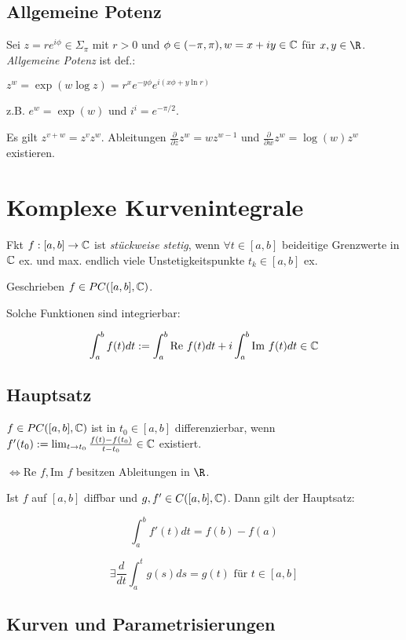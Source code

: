 \subsection*{Allgemeine Potenz}

Sei $z = re^{i\phi} \in \Sigma_\pi$ mit $r > 0$ und $\phi \in (-\pi,\pi), w = x + iy \in \mathbb{C}$ für $x, y \in \R$. \emph{Allgemeine Potenz} ist def.:

$z^w = \exp(w \log z) = r^x e^{-y\phi} e^{i(x\phi + y \ln r)}$

z.B. $e^w = \exp(w)$ und $i^i = e^{-\pi/2}$.

\spacing

Es gilt $z^{v+w} = z^v z^w$. Ableitungen $\frac{\partial}{\partial z} z^w = wz^{w-1}$ und $\frac{\partial}{\partial w} z^w = \log(w)z^w$ existieren.

\section*{Komplexe Kurvenintegrale}

Fkt $f : [a,b] \to \mathbb{C}$ ist \emph{stückweise stetig}, wenn $\forall t \in [a,b]$ beideitige Grenzwerte in $\mathbb{C}$ ex. und max. endlich viele Unstetigkeitspunkte $t_k \in [a,b]$ ex.

Geschrieben $f \in PC([a,b],\mathbb{C})$.

Solche Funktionen sind integrierbar:

\vspace*{-4mm}
$$\int_a^b f(t) dt := \int_a^b \text{Re } f(t) dt + i \int_a^b \text{Im } f(t) dt \in \mathbb{C}$$

\subsection*{Hauptsatz}

$f \in PC([a,b],\mathbb{C})$ ist in $t_0 \in [a,b]$ differenzierbar, wenn $f'(t_0) := \lim_{t \to t_0} \frac{f(t)-f(t_0)}{t-t_0} \in \mathbb{C}$ existiert.

$\iff \text{Re } f, \text{Im } f$ besitzen Ableitungen in $\R$.

Ist $f$ auf $[a,b]$ diffbar und $g, f' \in C([a,b],\mathbb{C})$. Dann gilt der Hauptsatz:

\vspace*{-3mm}
$$\int_a^b f'(t) dt = f(b) - f(a)$$

$$\exists \frac{d}{dt} \int_a^t g(s) ds = g(t) \text{ für } t \in [a,b]$$

\subsection*{Kurven und Parametrisierungen}

